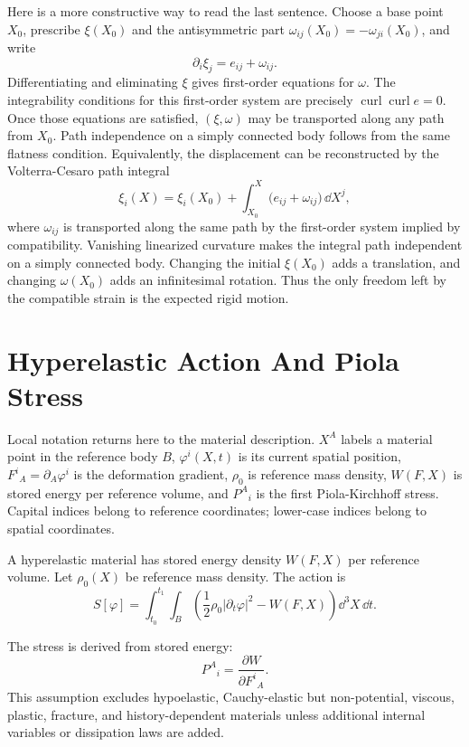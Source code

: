 Here is a more constructive way to read the last sentence. Choose a base point
\(X_0\), prescribe \(\xi(X_0)\) and the antisymmetric part
\(\omega_{ij}(X_0)=-\omega_{ji}(X_0)\), and write
\[
  \partial_i\xi_j=e_{ij}+\omega_{ij}.
\]
Differentiating and eliminating \(\xi\) gives first-order equations for
\(\omega\). The integrability conditions for this first-order system are
precisely \(\operatorname{curl}\operatorname{curl}e=0\). Once those equations
are satisfied, \((\xi,\omega)\) may be transported along any path from \(X_0\).
Path independence on a simply connected body follows from the same flatness
condition. Equivalently, the displacement can be reconstructed by the
Volterra-Cesaro path integral
\[
  \xi_i(X)=\xi_i(X_0)
  +
  \int_{X_0}^{X}
  \bigl(e_{ij}+\omega_{ij}\bigr)\,\dd X^j,
\]
where \(\omega_{ij}\) is transported along the same path by the first-order
system implied by compatibility. Vanishing linearized curvature makes the
integral path independent on a simply connected body. Changing the initial
\(\xi(X_0)\) adds a translation, and changing \(\omega(X_0)\) adds an
infinitesimal rotation. Thus the only freedom left by the compatible strain is
the expected rigid motion.

\section{Hyperelastic Action And Piola Stress}
\label{sec:hyperelastic-action}

Local notation returns here to the material description.  \(X^A\) labels a
material point in the reference body \(B\), \(\varphi^i(X,t)\) is its current
spatial position, \(F^i{}_A=\partial_A\varphi^i\) is the deformation gradient,
\(\rho_0\) is reference mass density, \(W(F,X)\) is stored energy per reference
volume, and \(P^A{}_i\) is the first Piola-Kirchhoff stress.  Capital indices
belong to reference coordinates; lower-case indices belong to spatial
coordinates.

A hyperelastic material has stored energy density \(W(F,X)\) per reference
volume. Let \(\rho_0(X)\) be reference mass density. The action is
\[
  S[\varphi]
  =
  \int_{t_0}^{t_1}\int_B
  \left(
    \frac12\rho_0|\partial_t\varphi|^2-W(F,X)
  \right)\dd^3X\,\dd t.
\]

\begin{assumption}
The stress is derived from stored energy:
\[
  P^A{}_i=\frac{\partial W}{\partial F^i{}_A}.
\]
This assumption excludes hypoelastic, Cauchy-elastic but non-potential,
viscous, plastic, fracture, and history-dependent materials unless additional
internal variables or dissipation laws are added.
\end{assumption}

